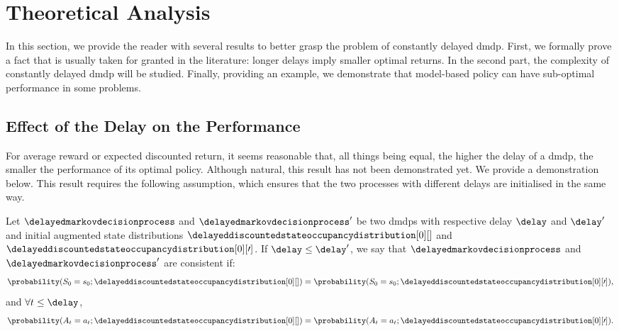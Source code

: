 \section{Theoretical Analysis}
\label{sec:th_analysis_belief}

In this section, we provide the reader with several results to better grasp the problem of constantly delayed \gls{dmdp}. 
First, we formally prove a fact that is usually taken for granted in the literature: longer delays imply smaller optimal returns.
In the second part, the complexity of constantly delayed \gls{dmdp} will be studied. 
Finally, providing an example, we demonstrate that model-based policy can have sub-optimal performance in some problems.


\subsection{Effect of the Delay on the Performance}
\label{subsec:effect_delay_belief}
For average reward or expected discounted return, it seems reasonable that, all things being equal, the higher the delay of a \gls{dmdp}, the smaller the performance of its optimal policy.
Although natural, this result has not been demonstrated yet. 
We provide a demonstration below. This result requires the following assumption, which ensures that the two processes with different delays are initialised in the same way.

\begin{defi}
\label{def:consistency_dmdps}
     Let $\delayedmarkovdecisionprocess$ and $\delayedmarkovdecisionprocess'$ be two \glspl{dmdp} with respective delay $\delay$ and $\delay'$ and initial augmented state distributions $\delayeddiscountedstateoccupancydistribution[0][]$ and $\delayeddiscountedstateoccupancydistribution[0][\prime]$.
     If $\delay\le \delay'$, we say that $\delayedmarkovdecisionprocess$ and $\delayedmarkovdecisionprocess'$ are consistent if:
    \begin{align*}
        \probability(S_0=s_0;\delayeddiscountedstateoccupancydistribution[0][])= \probability(S_0=s_0;\delayeddiscountedstateoccupancydistribution[0][\prime]),
    \end{align*}
    and $\forall t\le\delay$, 
    \begin{align*}
        \probability(A_t=a_t;\delayeddiscountedstateoccupancydistribution[0][])= \probability(A_t=a_t;\delayeddiscountedstateoccupancydistribution[0][\prime]).
    \end{align*}
\end{defi}


